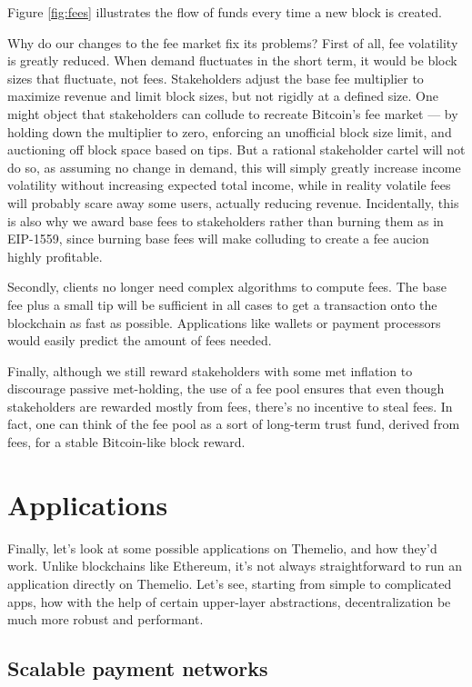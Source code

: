 \documentclass[headinclude]{scrbook}
\begin{document}
Figure \ref{fig:fees} illustrates the flow of funds every time a new block is created.

Why do our changes to the fee market fix its problems? First of all, fee volatility is greatly reduced. When demand fluctuates in the short term, it would be block sizes that fluctuate, not fees. Stakeholders adjust the base fee multiplier to maximize revenue and limit block sizes, but not rigidly at a defined size. One might object that stakeholders can collude to recreate Bitcoin's fee market --- by holding down the multiplier to zero, enforcing an unofficial block size limit, and auctioning off block space based on tips. But a rational stakeholder cartel will not do so, as assuming no change in demand, this will simply greatly increase income volatility without increasing expected total income, while in reality volatile fees will probably scare away some users, actually reducing revenue. Incidentally, this is also why we award base fees to stakeholders rather than burning them as in EIP-1559, since burning base fees will make colluding to create a fee aucion highly profitable.

Secondly, clients no longer need complex algorithms to compute fees. The base fee plus a small tip will be sufficient in all cases to get a transaction onto the blockchain as fast as possible. Applications like wallets or payment processors would easily predict the amount of fees needed.

Finally, although we still reward stakeholders with some met inflation to discourage passive met-holding, the use of a fee pool ensures that even though stakeholders are rewarded mostly from fees, there's no incentive to steal fees. In fact, one can think of the fee pool as a sort of long-term trust fund, derived from fees, for a stable Bitcoin-like block reward.

\chapter{Applications}

Finally, let's look at some possible applications on Themelio, and how they'd work. Unlike blockchains like Ethereum, it's not always straightforward to run an application directly on Themelio. Let's see, starting from simple to complicated apps, how with the help of certain upper-layer abstractions, decentralization be much more robust and performant.

\section{Scalable payment networks}
\end{document}
